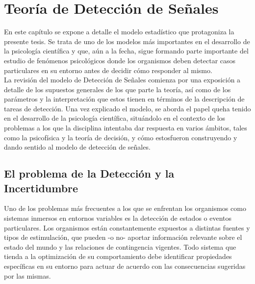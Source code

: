 
\chapter{Teoría de Detección de Señales} %

\label{Cap_SDT} %


\newcommand{\keyword}[1]{\textbf{#1}}
\newcommand{\tabhead}[1]{\textbf{#1}}
\newcommand{\code}[1]{\texttt{#1}}
\newcommand{\file}[1]{\texttt{\bfseries#1}}
\newcommand{\option}[1]{\texttt{\itshape#1}}


En este capítulo se expone a detalle el modelo estadístico que protagoniza la presente tesis. Se trata de uno de los modelos más importantes en el desarrollo de la psicología científica y que, aún a la fecha, sigue formando parte importante del estudio de fenómenos psicológicos donde los organismos deben detectar casos particulares en su entorno antes de decidir cómo responder al mismo.\\

La revisión del modelo de Detección de Señales comienza por una exposición a detalle de los supuestos generales de los que parte la teoría, así como de los parámetros y la interpretación que estos tienen en términos de la descripción de tareas de detección. Una vez explicado el modelo, se aborda el papel queha tenido en el desarrollo de la psicología científica, situándolo en el contexto de los problemas a los que la disciplina intentaba dar respuesta en varios ámbitos, tales como la psicofísica y la teoría de decisión, y cómo estosfueron construyendo y dando sentido al modelo de detección de señales.

\section{El problema de la Detección y la Incertidumbre}

Uno de los problemas más frecuentes a los que se enfrentan los organismos como sistemas inmersos en entornos variables es la detección de estados o eventos particulares. Los organismos están constantemente expuestos a distintas fuentes y tipos de estimulación, que pueden -o no- aportar información relevante sobre el estado del mundo y las relaciones de contingencia vigentes. Todo sistema que tienda a la optimización de su comportamiento debe identificar propiedades específicas en su entorno para actuar de acuerdo con las consecuencias sugeridas por las mismas. \\

